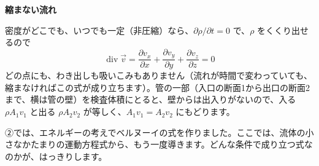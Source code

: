 \noindent\textbf{縮まない流れ}\par\nobreak
密度がどこでも、いつでも一定（非圧縮）なら、$\partial\rho/\partial t=0$ で、$\rho$ をくくり出せるので
\[ \operatorname{div}\vec{v}=\frac{\partial v_x}{\partial x}+\frac{\partial v_y}{\partial y}+\frac{\partial v_z}{\partial z}=0 \]
どの点にも、わき出しも吸いこみもありません（流れが時間で変わっていても、縮まなければこの式が成り立ちます）。管の一部（入口の断面1から出口の断面2まで、横は管の壁）を検査体積にとると、壁からは出入りがないので、入る $\rho A_1v_1$ と出る $\rho A_2v_2$ が等しく、$A_1v_1=A_2v_2$ にもどります。
\begin{phflow}
\end{phflow}


\leavevmode\label{ph:力-13:sec7}②では、エネルギーの考えでベルヌーイの式を作りました。ここでは、流体の小さなかたまりの運動方程式から、もう一度導きます。どんな条件で成り立つ式なのかが、はっきりします。

